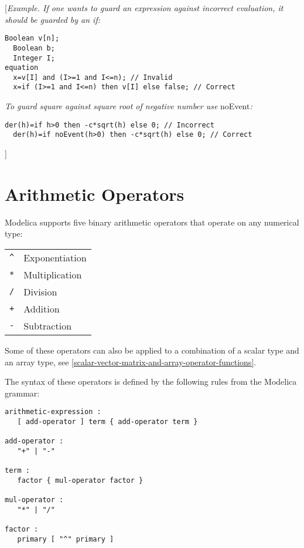 {[}\emph{Example. If one wants to guard an expression against incorrect
evaluation, it should be guarded by an if:}

\begin{lstlisting}[language=modelica]
  Boolean v[n];
  Boolean b;
  Integer I;
equation
  x=v[I] and (I>=1 and I<=n); // Invalid
  x=if (I>=1 and I<=n) then v[I] else false; // Correct
\end{lstlisting}

\emph{To guard square against square root of negative number use}
noEvent\emph{:}
\begin{lstlisting}[language=modelica]
  der(h)=if h>0 then -c*sqrt(h) else 0; // Incorrect
  der(h)=if noEvent(h>0) then -c*sqrt(h) else 0; // Correct
\end{lstlisting}
{]}

\section{Arithmetic Operators}

Modelica supports five binary arithmetic operators that operate on any
numerical type:

\begin{longtable}[c]{ll}
\lstinline!^! & Exponentiation\\
\lstinline!*! & Multiplication\\ 
\lstinline!/! & Division\\ 
\lstinline!+! & Addition\\ 
\lstinline!-! & Subtraction\\
\end{longtable}

Some of these operators can also be applied to a combination of a scalar
type and an array type, see \autoref{scalar-vector-matrix-and-array-operator-functions}.

The syntax of these operators is defined by the following rules from the
Modelica grammar:

\begin{lstlisting}[language=grammar]
arithmetic-expression :
   [ add-operator ] term { add-operator term }

add-operator :
   "+" | "-"
   
term :
   factor { mul-operator factor }

mul-operator :
   "*" | "/"
   
factor :
   primary [ "^" primary ]
\end{lstlisting}

